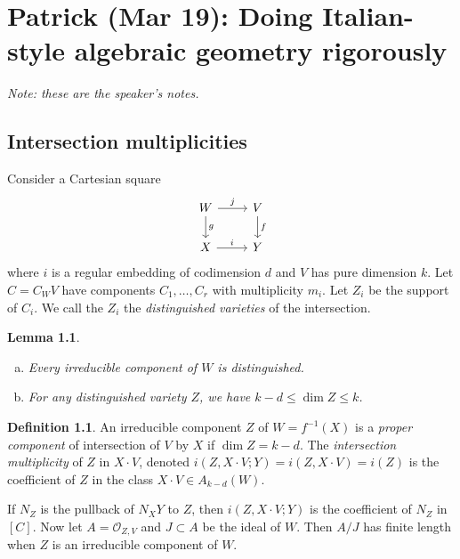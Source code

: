 \documentclass[leqno, openany]{memoir}
\newtheorem{lem}[thm]{Lemma}
\theoremstyle{definition}
\newtheorem{defn}[thm]{Definition}
\theoremstyle{remark}
\theoremstyle{plain}
\theoremstyle{definition}
\theoremstyle{remark}
\newcommand{\msc}[1]{\mathscr{#1}}
\begin{document}
\chapter{Patrick (Mar 19): Doing Italian-style algebraic geometry rigorously}%
\label{cha:patrick_mar_19_doing_italian_style_algebraic_geometry_rigorously}

\textit{Note: these are the speaker's notes.} 

\section{Intersection multiplicities}%
\label{sec:intersection_multiplicities}

Consider a Cartesian square
\begin{equation*}
\begin{tikzcd}
    W \ar{r}{j} \ar{d}{g} & V \ar{d}{f} \\
    X \ar{r}{i} & Y
\end{tikzcd}
\end{equation*}
where $i$ is a regular embedding of codimension $d$ and $V$ has pure dimension $k$. Let $C = C_W V$ have components $C_1, \ldots, C_r$ with multiplicity $m_i$. Let $Z_i$ be the support of $C_i$. We call the $Z_i$ the \textit{distinguished varieties} of the intersection.

\begin{lem}\leavevmode
    \begin{enumerate}[(a)]
        \item Every irreducible component of $W$ is distinguished.
        \item For any distinguished variety $Z$, we have $k-d \leq \dim Z \leq k$.
    \end{enumerate}
\end{lem}

\begin{defn}
    An irreducible component $Z$ of $W = f^{-1}(X)$ is a \textit{proper component} of intersection of $V$ by $X$ if $\dim Z = k-d$. The \textit{intersection multiplicity} of $Z$ in $X \cdot V$, denoted $i(Z, X \cdot V; Y) = i(Z, X \cdot V) = i(Z)$ is the coefficient of $Z$ in the class $X \cdot V \in A_{k-d}(W)$. 
\end{defn}

If $N_Z$ is the pullback of $N_X Y$ to $Z$, then $i(Z,X\cdot V; Y)$ is the coefficient of $N_Z$ in $[C]$. Now let $A = \msc{O}_{Z,V}$ and $J \subset A$ be the ideal of $W$. Then $A/J$ has finite length when $Z$ is an irreducible component of $W$.
\end{document}
